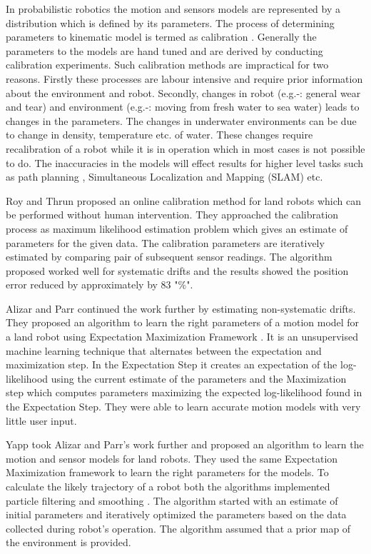 \documentclass[12pt,draft]{dalcsthesis}
\begin{document}
In probabilistic robotics the motion and sensors models are represented by a distribution which is defined by its parameters.  The process of determining parameters to kinematic model is termed as calibration \cite{cox1990autonomous} \cite{vukobratovic1989introduction}. Generally the parameters to the models are hand tuned and are derived by conducting calibration experiments. Such calibration methods are impractical for two reasons. Firstly these processes are labour intensive and require prior information about the environment and robot. Secondly, changes in robot (e.g.-:  general wear and tear) and environment (e.g.-: moving from fresh water to sea water) leads to changes in the parameters. The changes in underwater environments can be due to change in density, temperature etc. of water. These changes require recalibration of a robot while it is in operation which in most cases is not possible to do. The inaccuracies in the models will effect results for higher level tasks such as path planning \cite{Lav06}, Simultaneous Localization and 
Mapping (SLAM) \cite{thrun2005probabilistic} \cite{grisettiyz2005improving} etc.

Roy and Thrun \cite{Roy} proposed an online calibration method for land robots which can be performed without human intervention.  They approached the calibration process as maximum likelihood estimation problem which gives an estimate of parameters for the given data. The calibration parameters are iteratively estimated by comparing pair of subsequent sensor readings. The algorithm proposed worked well for systematic drifts and the results showed the position error reduced by approximately by 83 "\%".

Alizar and Parr \cite{Eliazar2004} continued the work further by estimating non-systematic drifts.  They proposed an algorithm to learn the right parameters of a motion model for a land robot using Expectation Maximization Framework \cite{dempster1977maximum}. It is an unsupervised machine learning technique that alternates between the expectation and maximization step. In the Expectation Step it creates an expectation of the log-likelihood using the current estimate of the parameters and the Maximization step which computes parameters maximizing the expected log-likelihood found in the Expectation Step. They were able to learn accurate motion models with very little user input.

Yapp \cite{Yap2008} took Alizar and Parr's \cite{Eliazar2004} work further and proposed an algorithm to learn the motion and sensor models for land robots. They used the same Expectation Maximization framework to learn the right parameters for the models. To calculate the likely trajectory of a robot both the algorithms implemented particle filtering \cite{ristic2004beyond} \cite{chen2003bayesian} and smoothing \cite{doucet2000monte}.  The algorithm started with an estimate of initial parameters and iteratively optimized the parameters based on the data collected during robot's operation. The algorithm assumed that a prior map of the environment is provided. 
\end{document}
